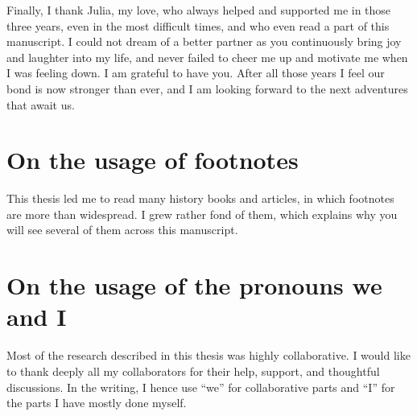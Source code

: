Finally, I thank Julia, my love, who always helped and supported me in those three years, even in the most difficult times, and who even read a part of this manuscript.
I could not dream of a better partner as you continuously bring joy and laughter into my life, and never failed to cheer me up and motivate me when I was feeling down. I am grateful to have you.
After all those years I feel our bond is now stronger than ever, and I am looking forward to the next adventures that await us.










\newpage

\section*{On the usage of footnotes}

This thesis led me to read many history books and articles, in which footnotes are more than widespread. I grew rather fond of them, which explains why you will see several of them across this manuscript.


\section*{On the usage of the pronouns we and I}

Most of the research described in this thesis was highly collaborative.
I would like to thank deeply all my collaborators for their help, support, and thoughtful discussions.
In the writing, I hence use ``we'' for collaborative parts and ``I'' for the parts I have mostly done myself.






















